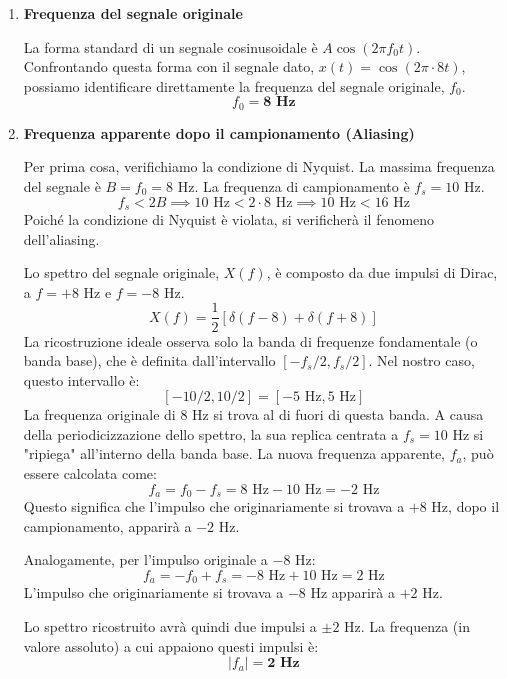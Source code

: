 
\begin{soluzione}{8}
    \begin{enumerate}
        \item \textbf{Frequenza del segnale originale}
        
        La forma standard di un segnale cosinusoidale è $A\cos(2\pi f_0 t)$. Confrontando questa forma con il segnale dato, $x(t) = \cos(2\pi \cdot 8t)$, possiamo identificare direttamente la frequenza del segnale originale, $f_0$.
        \[
            f_0 = \mathbf{8 \text{ Hz}}
        \]

        \item \textbf{Frequenza apparente dopo il campionamento (Aliasing)}
        
        Per prima cosa, verifichiamo la condizione di Nyquist. La massima frequenza del segnale è $B = f_0 = 8$ Hz. La frequenza di campionamento è $f_s = 10$ Hz.
        \[
            f_s < 2B \implies 10 \text{ Hz} < 2 \cdot 8 \text{ Hz} \implies 10 \text{ Hz} < 16 \text{ Hz}
        \]
        Poiché la condizione di Nyquist è violata, si verificherà il fenomeno dell'aliasing.
        
        Lo spettro del segnale originale, $X(f)$, è composto da due impulsi di Dirac, a $f = +8$ Hz e $f = -8$ Hz.
        \[
            X(f) = \frac{1}{2}[\delta(f-8) + \delta(f+8)]
        \]
        La ricostruzione ideale osserva solo la banda di frequenze fondamentale (o banda base), che è definita dall'intervallo $[-f_s/2, f_s/2]$. Nel nostro caso, questo intervallo è:
        \[
            [-10/2, 10/2] = [-5 \text{ Hz}, 5 \text{ Hz}]
        \]
        La frequenza originale di $8$ Hz si trova al di fuori di questa banda. A causa della periodicizzazione dello spettro, la sua replica centrata a $f_s=10$ Hz si "ripiega" all'interno della banda base. La nuova frequenza apparente, $f_a$, può essere calcolata come:
        \[
            f_a = f_0 - f_s = 8 \text{ Hz} - 10 \text{ Hz} = -2 \text{ Hz}
        \]
        Questo significa che l'impulso che originariamente si trovava a $+8$ Hz, dopo il campionamento, apparirà a $-2$ Hz.
        
        Analogamente, per l'impulso originale a $-8$ Hz:
        \[
            f_a = -f_0 + f_s = -8 \text{ Hz} + 10 \text{ Hz} = 2 \text{ Hz}
        \]
        L'impulso che originariamente si trovava a $-8$ Hz apparirà a $+2$ Hz.
        
        Lo spettro ricostruito avrà quindi due impulsi a $\pm 2$ Hz. La frequenza (in valore assoluto) a cui appaiono questi impulsi è:
        \[
            |f_a| = \mathbf{2 \text{ Hz}}
        \]

    \end{enumerate}
\end{soluzione}